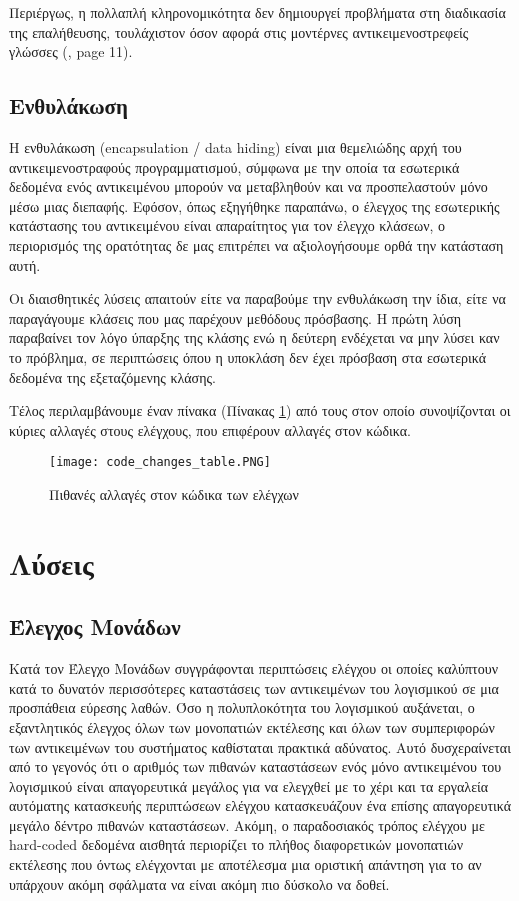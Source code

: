 \documentclass[12pt]{article}
\begin{document}
\par Περιέργως, η πολλαπλή κληρονομικότητα δεν δημιουργεί προβλήματα στη διαδικασία της επαλήθευσης, τουλάχιστον όσον αφορά στις μοντέρνες αντικειμενοστρεφείς γλώσσες (\textcite{barbey}, page 11).

\subsection{Ενθυλάκωση}

Η ενθυλάκωση (encapsulation / data hiding) είναι μια θεμελιώδης αρχή του αντικειμενοστραφούς προγραμματισμού, σύμφωνα με την οποία τα εσωτερικά δεδομένα ενός αντικειμένου μπορούν να μεταβληθούν και να προσπελαστούν μόνο μέσω μιας διεπαφής. Εφόσον, όπως εξηγήθηκε παραπάνω, ο έλεγχος της εσωτερικής κατάστασης του αντικειμένου είναι απαραίτητος για τον έλεγχο κλάσεων, ο περιορισμός της ορατότητας δε μας επιτρέπει να αξιολογήσουμε ορθά την κατάσταση αυτή. 

\par Οι διαισθητικές λύσεις απαιτούν είτε να παραβούμε την ενθυλάκωση την ίδια, είτε να παραγάγουμε κλάσεις που μας παρέχουν μεθόδους πρόσβασης. Η πρώτη λύση παραβαίνει τον λόγο ύπαρξης της κλάσης ενώ η δεύτερη ενδέχεται να μην λύσει καν το πρόβλημα, σε περιπτώσεις όπου η υποκλάση δεν έχει πρόσβαση στα εσωτερικά δεδομένα της εξεταζόμενης κλάσης.\newline 

Τέλος περιλαμβάνουμε έναν πίνακα (Πίνακας \ref{fig:panos}) από τους \textcite{kung} στον οποίο συνοψίζονται οι κύριες  αλλαγές στους ελέγχους, που επιφέρουν αλλαγές στον κώδικα.

\begin{figure}
\label{fig:panos}
\caption{Πιθανές αλλαγές στον κώδικα των ελέγχων}
\texttt{[image: code\_changes\_table.PNG]}
\end{figure}

\section{Λύσεις}

\subsection{Έλεγχος Μονάδων}
Κατά τον Έλεγχο Μονάδων συγγράφονται περιπτώσεις ελέγχου οι οποίες καλύπτουν κατά το δυνατόν περισσότερες καταστάσεις των αντικειμένων του λογισμικού σε μια προσπάθεια εύρεσης λαθών. Όσο η πολυπλοκότητα του λογισμικού αυξάνεται, ο εξαντλητικός έλεγχος όλων των μονοπατιών εκτέλεσης και όλων των συμπεριφορών των αντικειμένων του συστήματος καθίσταται πρακτικά αδύνατος. Αυτό δυσχεραίνεται από το γεγονός ότι ο αριθμός των πιθανών καταστάσεων ενός μόνο αντικειμένου του λογισμικού είναι απαγορευτικά μεγάλος για να ελεγχθεί με το χέρι και τα εργαλεία αυτόματης κατασκευής περιπτώσεων ελέγχου κατασκευάζουν ένα επίσης απαγορευτικά μεγάλο δέντρο πιθανών καταστάσεων. Ακόμη, ο παραδοσιακός τρόπος ελέγχου με hard-coded δεδομένα αισθητά περιορίζει το πλήθος διαφορετικών μονοπατιών εκτέλεσης που όντως ελέγχονται με αποτέλεσμα μια οριστική απάντηση για το αν υπάρχουν ακόμη σφάλματα να είναι ακόμη πιο δύσκολο να δοθεί.
\end{document}
